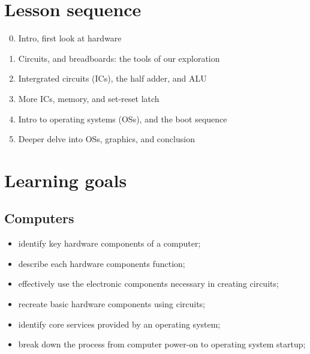 \documentclass[11pt]{article}
\begin{document}
\vfill
\section*{Lesson sequence}

\begin{enumerate}
    \setcounter{enumi}{-1}
  \item Intro, first look at hardware
  \item Circuits, and breadboards: the tools of our exploration
  \item Intergrated circuits (ICs), the half adder, and ALU
  \item More ICs, memory, and set-reset latch
  \item Intro to operating systems (OSs), and the boot sequence
  \item Deeper delve into OSs, graphics, and conclusion
\end{enumerate}

\section*{Learning goals}

\subsection*{Computers}

\begin{itemize}
  \item identify key hardware components of a computer;
  \item describe each hardware components function;
  \item effectively use the electronic components necessary in creating circuits;
  \item recreate basic hardware components using circuits;
  \item identify core services provided by an operating system;
  \item break down the process from computer power-on to operating system
    startup;
\end{itemize}
\end{document}
